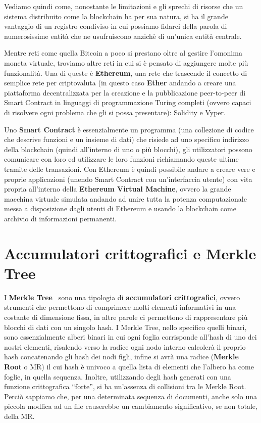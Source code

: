 Vediamo quindi come, nonostante le limitazioni e gli sprechi di risorse che un sistema 
distribuito come la blockchain ha per sua natura, si ha il grande vantaggio 
di un registro condiviso in cui possiamo fidarci della parola di numerosissime 
entità che ne usufruiscono anzichè di un’unica entità centrale.

\label{sub:eth}
Mentre reti come quella Bitcoin a poco si prestano oltre al gestire l’omonima moneta virtuale, 
troviamo altre reti in cui si è pensato di aggiungere molte più funzionalità.
Una di queste è \textbf{Ethereum}, una rete che trascende il concetto di semplice rete 
per criptovaluta (in questo caso \textbf{Ether} andando a creare una piattaforma 
decentralizzata per la creazione e la pubblicazione peer-to-peer di Smart Contract 
in linguaggi di programmazione Turing completi (ovvero capaci di risolvere ogni problema 
che gli si possa presentare): Solidity e Vyper. 

Uno \textbf{Smart Contract} è essenzialmente un programma (una collezione di codice che descrive 
funzioni e un insieme di dati) che risiede ad uno specifico indirizzo della blockchain 
(quindi all’interno di uno o più blocchi), gli utilizzatori possono comunicare con loro 
ed utilizzare le loro funzioni richiamando queste ultime tramite delle transazioni. 
Con Ethereum è quindi possibile andare a creare vere e proprie applicazioni 
(unendo Smart Contract con un’interfaccia utente) con vita propria all’interno della 
\textbf{Ethereum Virtual Machine}, ovvero la grande macchina virtuale simulata andando 
ad unire tutta la potenza computazionale messa a disposizione dagli utenti di Ethereum 
e usando la blockchain come archivio di informazioni permanenti. 


\section{Accumulatori crittografici e Merkle Tree}
\label{sub:mt}
I \textbf{Merkle Tree}~\cite{mertree} sono una tipologia di \textbf{accumulatori crittografici}, ovvero strumenti che permettono
di comprimere molti elementi informativi in una costante di dimensione fissa, in altre parole
ci permettono di rappresentare più blocchi di dati con un singolo hash.
I Merkle Tree, nello specifico quelli binari, sono essenzialmente alberi binari
in cui ogni foglia corrisponde all’hash di uno dei nostri elementi, risalendo verso la radice ogni
nodo interno calcolerà il proprio hash concatenando gli hash dei nodi figli, infine si avrà
una radice (\textbf{Merkle Root} o MR) il cui hash è univoco a quella lista di elementi che l’albero
ha come foglie, in quella sequenza.
Inoltre, utilizzando degli hash generati con una funzione crittografica “forte”, si ha
un’assenza di collisioni tra le Merkle Root.
Perciò sappiamo che, per una determinata sequenza di documenti, anche solo una
piccola modfica ad un file causerebbe un cambiamento significativo, se non totale, della MR.

